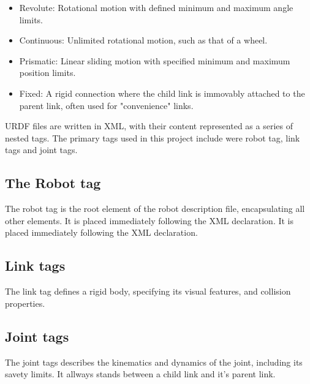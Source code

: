 \begin{itemize}
    \item Revolute: Rotational motion with defined minimum and maximum angle limits.
    \item Continuous: Unlimited rotational motion, such as that of a wheel.
    \item Prismatic: Linear sliding motion with specified minimum and maximum position limits.
    \item Fixed: A rigid connection where the child link is immovably attached to the parent link, often used for "convenience" links.
\end{itemize} \autocite{newansDescribingRobotsURDF}

URDF files are written in XML, with their content represented as a series of nested tags. The primary tags used in this project include were robot tag, link tags and joint tags.

\subsection{The Robot tag}

The robot tag is the root element of the robot description file, encapsulating all other elements.  It is placed immediately following the XML declaration.  It is placed immediately following the XML declaration. \autocite{UrdfXMLROS}



\subsection{Link tags}

The link tag defines a rigid body, specifying its visual features, and collision properties. \autocite{UrdfXMLROS}



\subsection{Joint tags}

The joint tags describes the kinematics and dynamics of the joint, including its savety limits. It allways stands between a child link and it's parent link.\autocite{UrdfXMLROS} 



